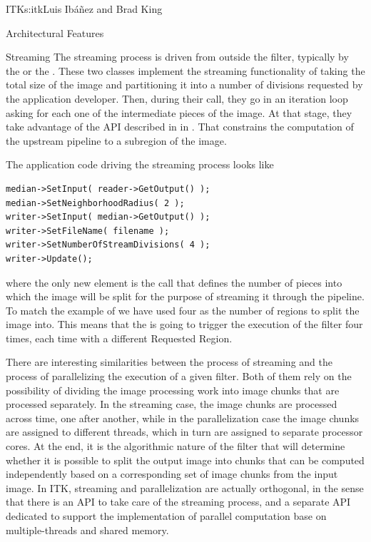 \begin{aosachapter}{ITK}{s:itk}{Luis Ib\'{a}\~{n}ez and Brad King}
\begin{aosasect1}{Architectural Features}
\begin{aosasect2}{Streaming}
The streaming process is driven from outside the filter, typically by the
 or the . These two classes
implement the streaming functionality of taking the total size of the image
and partitioning it into a number of divisions requested by the application
developer.  Then, during their  call, they go in an iteration
loop asking for each one of the intermediate pieces of the image. At that
stage, they take advantage of the  API described in
 in
. That constrains the
computation of the upstream pipeline to a subregion of the image.

The application code driving the streaming process looks like

\begin{verbatim}
median->SetInput( reader->GetOutput() );
median->SetNeighborhoodRadius( 2 );
writer->SetInput( median->GetOutput() );
writer->SetFileName( filename );
writer->SetNumberOfStreamDivisions( 4 );
writer->Update();
\end{verbatim}

\noindent where the only new element is the  call
that defines the number of pieces into which the image will be split for the
purpose of streaming it through the pipeline. To match the example of
 we have used  four as the number of regions to
split the image into. This means that the  is going to trigger the
execution of the  filter four times, each time with a different
Requested Region.

There are interesting similarities between the process of streaming
and the process of parallelizing the execution of a given filter. Both
of them rely on the possibility of dividing the image processing work
into image chunks that are processed separately. In the streaming
case, the image chunks are processed across time, one after another,
while in the parallelization case the image chunks are assigned to
different threads, which in turn are assigned to separate processor
cores. At the end, it is the algorithmic nature of the filter
that will determine whether it is possible to split the output
image into chunks that can be computed independently based on a
corresponding set of image chunks from the input image. In ITK,
streaming and parallelization are actually orthogonal, in the sense
that there is an API to take care of the streaming process, and a
separate API dedicated to support the implementation of parallel
computation base on multiple-threads and shared memory.


\end{aosasect2}
\end{aosasect1}
\end{aosachapter}
